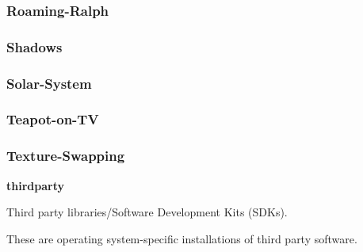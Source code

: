 \documentclass[a4paper]{article}
\begin{document}
\clearpage\subsubsection[Roaming{}-Ralph]{Roaming-Ralph}
\hypertarget{RefHeading23971167907073}{}\subsubsection{}
\clearpage\subsubsection[Shadows]{Shadows}
\hypertarget{RefHeading23991167907073}{}\subsubsection{}
\clearpage\subsubsection[Solar{}-System]{Solar-System}
\hypertarget{RefHeading24011167907073}{}\subsubsection{}
\clearpage\subsubsection[Teapot{}-on{}-TV]{Teapot-on-TV}
\hypertarget{RefHeading24031167907073}{}\subsubsection{}
\clearpage\subsubsection[Texture{}-Swapping]{Texture-Swapping}
\hypertarget{RefHeading24051167907073}{}\clearpage
\bigskip


\bigskip

{\centering\sffamily\bfseries
\hypertarget{RefHeading24071167907073}{}thirdparty
\par}

{\centering\color{black}
Third party libraries/Software Development Kits (SDKs).
\par}

{\centering\color{black}
These are operating system-specific installations of third party software. 
\par}
\end{document}
